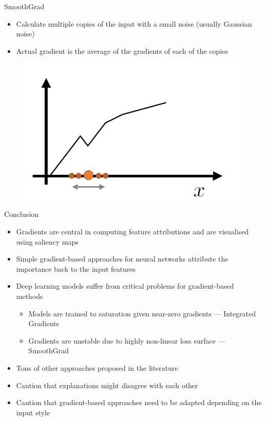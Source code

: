 \documentclass[11pt,compress,t,notes=noshow, aspectratio=169, xcolor=table]{beamer}
\begin{document}
\begin{frame}{SmoothGrad}
    \begin{itemize}
        \item Calculate multiple copies of the input with a small noise (usually Gaussian noise)
        \item Actual gradient is the average of the gradients of each of the copies
    \end{itemize}
    \begin{figure}
        \centering
        \includegraphics[width=0.6\linewidth]{bild27}
    \end{figure}
\end{frame}

\begin{frame}{Conclusion}
\begin{itemize}
    \item Gradients are central in computing feature attributions and are visualised using
saliency maps
\item Simple gradient-based approaches for neural networks attribute the importance back to
the input features
\item Deep learning models suffer from critical problems for gradient-based methods
\begin{itemize}
    \item Models are trained to saturation given near-zero gradients — Integrated Gradients
    \item Gradients are unstable due to highly non-linear loss surface — SmoothGrad
\end{itemize}
\item Tons of other approaches proposed in the literature
\item Caution that explanations might disagree with each other
\item Caution that gradient-based approaches need to be adapted depending on the input
style
\end{itemize}
\end{frame}

\endlecture
\end{document}
